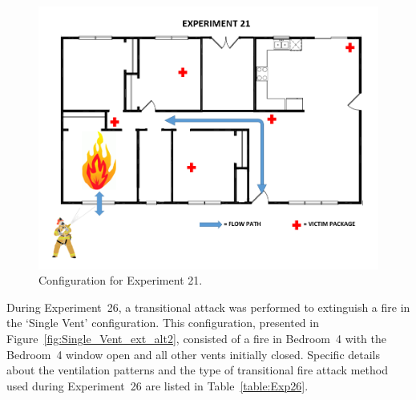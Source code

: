 \documentclass[12pt,oneside]{book}
\begin{document}
\begin{figure}[H]
	\centering
	\includegraphics[width=5in]{Figures/General/Exp21.png}
	\caption{Configuration for Experiment 21.}
	\label{fig:Single_Vent_ext_alt1}
\end{figure}

\begin{table}[H]
\caption{Experiment 21}
\centering
{}
\label{table:Exp21}
\end{table}

During Experiment~26, a transitional attack was performed to extinguish a fire in the `Single Vent' configuration. This configuration, presented in Figure~\ref{fig:Single_Vent_ext_alt2}, consisted of a fire in Bedroom~4 with the Bedroom~4 window open and all other vents initially closed. Specific details about the ventilation patterns and the type of transitional fire attack method used during Experiment~26 are listed in Table~\ref{table:Exp26}.
\end{document}
